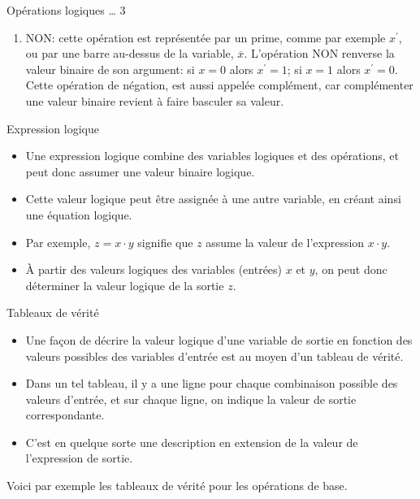 \documentclass[presentation]{beamer}
\begin{document}
\begin{frame}[label={sec:orgf0a8aa9}]{Opérations logiques \ldots{} 3}
\begin{enumerate}
\item NON: cette opération est représentée par un prime, comme par
exemple \(x^\prime\), ou par une barre au-dessus de la variable,
\(\overline{x}\).  L'opération NON renverse la valeur binaire de
son argument: si \(x =0\) alors \(x^ \prime = 1\); si \(x =1\)
alors \(x^ \prime = 0\). Cette opération de négation, est aussi
appelée complément, car complémenter une valeur binaire revient à
faire basculer sa valeur.
\end{enumerate}
\end{frame}

\begin{frame}[label={sec:org17a5a62}]{Expression logique}
\begin{itemize}
\item Une expression logique combine des variables logiques et des opérations, et peut donc assumer une valeur binaire logique.

\item Cette valeur logique peut être assignée à une autre variable, en créant ainsi une équation logique.

\item Par exemple, \(z = x \cdot y\) signifie que \(z\) assume la valeur de l'expression \(x \cdot y\).

\item À partir des valeurs logiques des variables (entrées) \(x\) et \(y\), on peut donc déterminer la valeur logique de la sortie \(z\).
\end{itemize}
\end{frame}

\begin{frame}[label={sec:org8cd1519}]{Tableaux de vérité}
\begin{itemize}
\item Une façon de décrire la valeur logique d'une variable de sortie en fonction des valeurs possibles des variables d'entrée est au moyen d'un tableau de vérité.

\item Dans un tel tableau, il y a une ligne pour chaque combinaison possible des valeurs d'entrée, et sur chaque ligne, on indique la valeur de sortie correspondante.

\item C'est en quelque sorte une description en extension de la valeur de l'expression de sortie.
\end{itemize}

Voici par exemple les tableaux de vérité pour les opérations de base.
\end{frame}
\end{document}
